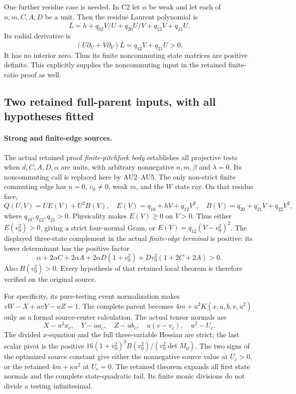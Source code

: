 One further residue case is needed.
In C2 let \(\alpha\) be weak and let each of \(n,m,C,A,D\) be a unit.
Then
the residue Laurent polynomial is
\[
 \bar L=h+q_{02}V/U+q_{20}U/V+q_{12}V+q_{21}U .
\]
Its radial derivative is
\[
 (U\partial_U+V\partial_V)\bar L=q_{12}V+q_{21}U>0.
 \tag{AU6}
\]
It has no interior zero. Thus its finite noncommuting state
matrices are positive definite. This explicitly supplies the
noncommuting input in the retained finite-ratio proof as well.

\subsection{Two retained full-parent inputs, with all hypotheses fitted}

\paragraph{Strong and finite-edge sources.}
The actual retained proof \emph{finite-pitchfork body} establishes
all projective tests when \(d,C,A,D,\alpha\) are units, with
arbitrary nonnegative \(n,m,\beta\) and \(\lambda=0\).
Its noncommuting call is replaced here by AU2--AU5.
The only non-strict finite commuting edge has \(u=0\), \(v_0\ne0\),
weak \(m\), and the \(W\) state ray. On that residue face,
\[
 Q(U,V)=U E(V)+U^2B(V),\quad
 E(V)=q_{10}+hV+q_{12}V^2,\quad
 B(V)=q_{20}+q_{21}V+q_{22}V^2,
 \tag{AU7}
\]
where \(q_{10},q_{12},q_{21}>0\).
Physicality makes \(E(V)\geq0\) on \(V>0\).
Thus either \(E(v_0^2)>0\), giving a strict four-normal Gram,
or \(E(V)=q_{12}(V-v_0^2)^2\).
The displayed three-state complement in the actual
\emph{finite-edge terminal} is positive: its lower determinant
has the positive factor
\[
 \alpha+2\alpha C+2\alpha A+2\alpha D(1+v_0^2)
                     +Dv_0^2(1+2C+2A)>0.
\]
Also \(B(v_0^2)>0\). Every hypothesis of that retained local
theorem is therefore verified on the original source.

For specificity, its pure-testing event normalization makes
\(vW-X+uvY-uZ=1\). The complete parent becomes
\(4m+u^2K(x,a,b,v,u^2)\) only as a formal source-center calculation.
The actual tensor normals are
\[
 X-u^2x_c,\quad Y-ua_c,\quad Z-ub_c,\quad
 u(v-v_c),\quad u^2-U_c .
 \tag{AU8}
\]
The divided \(x\)-equation and the full three-variable Hessian
are strict; the last scalar pivot is the positive
\(16(1+v_0^2)^2B(v_0^2)/(v_0^2\det M_0)\).
The two signs of the optimized source constant give either
the nonnegative source value at \(U_c>0\), or the retained
\(4m+\kappa u^2\) at \(U_c=0\).
The retained theorem expands all first state normals and the
complete state-quadratic tail. Its finite monic divisions do
not divide a testing infinitesimal.

